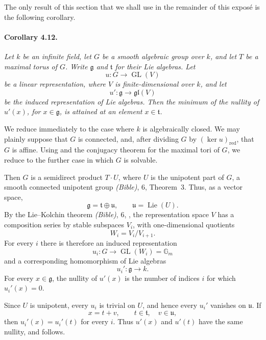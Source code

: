 The only result of this section that we shall use in the remainder
of this exposé is the following corollary.

\paragraph{\textbf{Corollary 4.12.}}
{\itshape Let \(k\) be an infinite field, let \(G\) be a smooth
algebraic group over \(k\), and let \(T\) be a maximal torus of
\(G\). Write \(\mathfrak g\) and \(\mathfrak t\) for their Lie
algebras. Let
\[
  u\colon G\longrightarrow\operatorname{GL}(V)
\]
be a linear representation, where \(V\) is finite-dimensional over
\(k\), and let
\[
  u'\colon\mathfrak g\longrightarrow\mathfrak{gl}(V)
\]
be the induced representation of Lie algebras. Then the minimum of
the nullity of \(u'(x)\), for \(x\in\mathfrak g\), is attained at
an element \(x\in\mathfrak t\).}

We reduce immediately to the case where \(k\) is algebraically
closed. We may plainly suppose that \(G\) is connected, and, after
dividing \(G\) by \((\ker u)_{\mathrm{red}}\), that \(G\) is
affine. Using  and the conjugacy theorem for the maximal tori
of \(G\), we reduce to the further case in which \(G\) is solvable.

Then \(G\) is a semidirect product \(T\cdot U\), where \(U\) is the
unipotent part of \(G\), a smooth connected unipotent group
\textup{\emph{(Bible)}, 6, Theorem~3}. Thus, as a vector space,
\[
  \mathfrak g=\mathfrak t\oplus\mathfrak u,
  \qquad
  \mathfrak u=\operatorname{Lie}(U).
\]
By the Lie--Kolchin theorem
\textup{\emph{(Bible)}, 6, }, the representation space
\(V\) has a composition series by stable subspaces \(V_i\), with
one-dimensional quotients
\[
  W_i=V_i/V_{i+1}.
\]
For every \(i\) there is therefore an induced representation
\[
  u_i\colon G\longrightarrow
  \operatorname{GL}(W_i)=\mathbb G_m
\]
and a corresponding homomorphism of Lie algebras
\[
  u_i'\colon\mathfrak g\longrightarrow k.
\]
For every \(x\in\mathfrak g\), the nullity of \(u'(x)\) is the
number of indices \(i\) for which \(u_i'(x)=0\).

Since \(U\) is unipotent, every \(u_i\) is trivial on \(U\), and
hence every \(u_i'\) vanishes on \(\mathfrak u\). If
\[
  x=t+v,\qquad t\in\mathfrak t,\quad v\in\mathfrak u,
\]
then \(u_i'(x)=u_i'(t)\) for every \(i\). Thus \(u'(x)\) and
\(u'(t)\) have the same nullity, and  follows.

